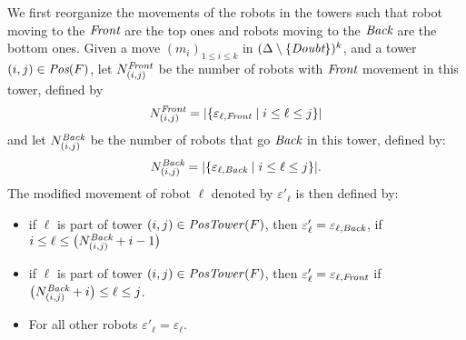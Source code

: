  We first reorganize the movements of the robots in the towers such that 
 robot moving to the $\textit{Front}$ are the top ones and robots moving to 
 the $\textit{Back}$ are the bottom ones.
 Given a move $(m_i)_{1\leq i \leq k}$ in $(\Delta \setminus \{\textit{Doubt}\})^k$, and a tower $(i, j)\in\textit{Pos}(F)$, 
 let $N^{\textit{Front}}_{(i, j)}$ be the number of robots with $\textit{Front}$ movement in this tower, 
 defined by $$N^{\textit{Front}}_{(i, j)}=|\{\varepsilon_{\ell, \textit{Front}} \mid i\leq \ell \leq j\}|$$ and let  
$N^{\textit{Back}}_{(i, j)}$ be the number of robots that go $\textit{Back}$ in this tower, defined by:  
$$N^{\textit{Back}}_{(i, j)}=|\{\varepsilon_{\ell, \textit{Back}} \mid i\leq \ell \leq j\}|.$$ 
The modified movement of robot $\ell$ denoted by $\varepsilon'_\ell$ is then defined by:  
\begin{itemize}
 \item if $\ell$ is part of tower $(i, j)\in\mathit{PosTower}(F)$, then $\varepsilon'_\ell=\varepsilon_{\ell, \textit{Back}}$, if $i\leq \ell \leq \bigl(N_{(i, j)}^{\textit{Back}} +i-1\bigr)$
 \item if $\ell$ is part of tower $(i, j)\in\mathit{PosTower}(F)$, then $\varepsilon'_\ell = \varepsilon_{\ell, \textit{Front}}$ if $\bigl(N_{(i, j)}^{\textit{Back}} +i\bigr)\leq \ell \leq j$. 
 \item For all other robots $\varepsilon'_\ell=\varepsilon_\ell$. 
 \end{itemize}
 
